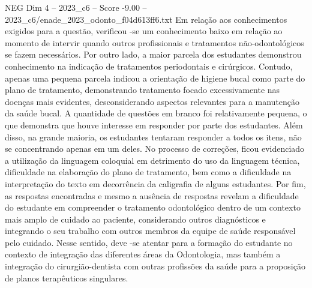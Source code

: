 \begin{textsample}{NEG Dim 4 – 2023\_c6 – Score -9.00 – 2023\_c6/enade\_2023\_odonto\_f04d613ff6.txt}
Em relação aos conhecimentos exigidos para a questão, verificou -se um conhecimento baixo em relação ao momento de intervir quando outros profissionais e tratamentos não-odontológicos se fazem necessários.
Por outro lado, a maior parcela dos estudantes demonstrou conhecimento na indicação de tratamentos periodontais e cirúrgicos.
Contudo, apenas uma pequena parcela indicou a orientação de higiene bucal como parte do plano de tratamento, demonstrando tratamento focado excessivamente nas doenças mais evidentes, desconsiderando aspectos relevantes para a manutenção da saúde bucal.
A quantidade de questões em branco foi relativamente pequena, o que demonstra que houve interesse em responder por parte dos estudantes.
Além disso, na grande maioria, os estudantes tentaram responder a todos os itens, não se concentrando apenas em um deles.
No processo de correções, ficou evidenciado a utilização da linguagem coloquial em detrimento do uso da linguagem técnica, dificuldade na elaboração do plano de tratamento, bem como a dificuldade na interpretação do texto em decorrência da caligrafia de alguns estudantes.
Por fim, as respostas encontradas e mesmo a ausência de respostas revelam a dificuldade do estudante em compreender o tratamento odontológico dentro de um contexto mais amplo de cuidado ao paciente, considerando outros diagnósticos e integrando o seu trabalho com outros membros da equipe de saúde responsável pelo cuidado.
Nesse sentido, deve -se atentar para a formação do estudante no contexto de integração das diferentes áreas da Odontologia, mas também a integração do cirurgião-dentista com outras profissões da saúde para a proposição de planos terapêuticos singulares.

\end{textsample}
